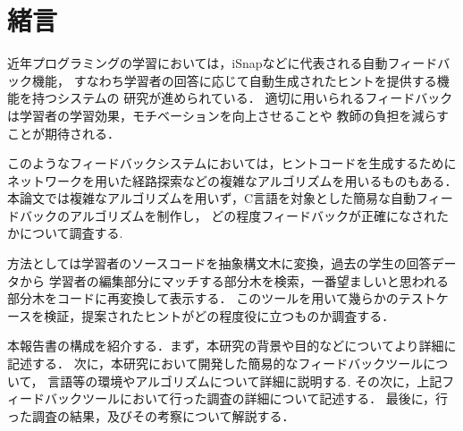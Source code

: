 \documentclass[main]{subfiles}
\begin{document}
\chapter{緒言}
近年プログラミングの学習においては，iSnapなどに代表される自動フィードバック機能，
すなわち学習者の回答に応じて自動生成されたヒントを提供する機能を持つシステムの
研究が進められている．
適切に用いられるフィードバックは学習者の学習効果，モチベーションを向上させることや
教師の負担を減らすことが期待される．


このようなフィードバックシステムにおいては，ヒントコードを生成するために
ネットワークを用いた経路探索などの複雑なアルゴリズムを用いるものもある．
本論文では複雑なアルゴリズムを用いず，C言語を対象とした簡易な自動フィードバックのアルゴリズムを制作し，
どの程度フィードバックが正確になされたかについて調査する.

方法としては学習者のソースコードを抽象構文木に変換，過去の学生の回答データから
学習者の編集部分にマッチする部分木を検索，一番望ましいと思われる部分木をコードに再変換して表示する．
このツールを用いて幾らかのテストケースを検証，提案されたヒントがどの程度役に立つものか調査する．

本報告書の構成を紹介する．まず，本研究の背景や目的などについてより詳細に記述する．
次に，本研究において開発した簡易的なフィードバックツールについて，
言語等の環境やアルゴリズムについて詳細に説明する.
その次に，上記フィードバックツールにおいて行った調査の詳細について記述する．
最後に，行った調査の結果，及びその考察について解説する．
\end{document}
